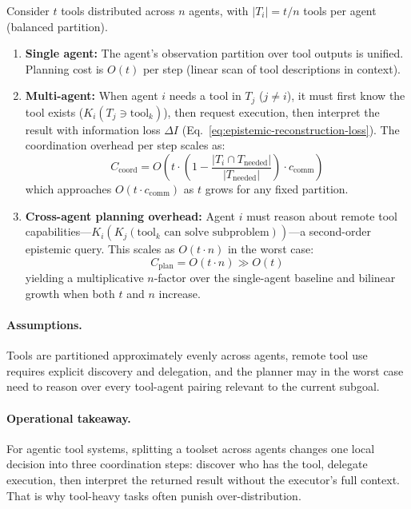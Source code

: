 \begin{theorem}
\label{thm:tool-density}
Consider $t$ tools distributed across $n$ agents, with $|T_i| = t/n$ tools per agent (balanced partition).
\begin{enumerate}[leftmargin=*]
\item[(a)] \textbf{Single agent:} The agent's observation partition over tool outputs is unified. Planning cost is $O(t)$ per step (linear scan of tool descriptions in context).
\item[(b)] \textbf{Multi-agent:} When agent $i$ needs a tool in $T_j$ ($j \ne i$), it must first know the tool exists ($K_i(T_j \ni \mathrm{tool}_k)$), then request execution, then interpret the result with information loss $\Delta I$ (Eq.~\eqref{eq:epistemic-reconstruction-loss}). The coordination overhead per step scales as:
\begin{equation}
C_{\mathrm{coord}} = O\!\left(t \cdot \left(1 - \frac{|T_i \cap T_{\mathrm{needed}}|}{|T_{\mathrm{needed}}|}\right) \cdot c_{\mathrm{comm}}\right)
\label{eq:tool-coord-overhead}
\end{equation}
which approaches $O(t \cdot c_{\mathrm{comm}})$ as $t$ grows for any fixed partition.
\item[(c)] \textbf{Cross-agent planning overhead:} Agent $i$ must reason about remote tool capabilities---$K_i(K_j(\mathrm{tool}_k \text{ can solve subproblem}))$---a second-order epistemic query. This scales as $O(t \cdot n)$ in the worst case:
\begin{equation}
C_{\mathrm{plan}} = O(t \cdot n) \gg O(t)
\label{eq:tool-planning-cost}
\end{equation}
yielding a multiplicative $n$-factor over the single-agent baseline and bilinear growth when both $t$ and $n$ increase.
\end{enumerate}
\end{theorem}

\paragraph{Assumptions.}
Tools are partitioned approximately evenly across agents, remote tool use requires explicit discovery and delegation, and the planner may in the worst case need to reason over every tool-agent pairing relevant to the current subgoal.

\paragraph{Operational takeaway.}
For agentic tool systems, splitting a toolset across agents changes one local decision into three coordination steps: discover who has the tool, delegate execution, then interpret the returned result without the executor's full context. That is why tool-heavy tasks often punish over-distribution.

